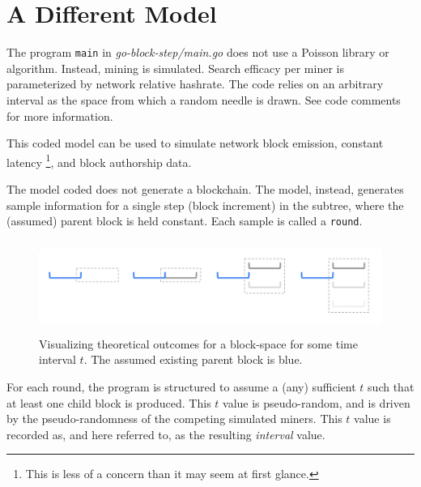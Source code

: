 \documentclass[11pt]{article}
\theoremstyle{plain}
\begin{document}

%
%


\section{\normalsize{A Different Model}}

The program \texttt{main} in \textit{go-block-step/main.go} does not use
a Poisson library or algorithm.
Instead, mining is simulated.
Search efficacy per miner is parameterized by network relative hashrate.
The code relies on an arbitrary interval as the space from which a random needle
is drawn. See code comments for more information.

This coded model can be used to simulate network block emission, constant latency\nolinebreak
\footnote{This is less of a concern than it may seem at first glance.}, and
block authorship data.

The model coded does not generate a blockchain. The model, instead,
generates sample information for a single step (block increment)
in the subtree, where the (assumed) parent block is held constant.
Each sample is called a \texttt{round}.

\begin{figure}[tph]
    \centering
    \includegraphics[height=3cm]{vis_theoretical_block-space.png}
    \caption{
        Visualizing theoretical outcomes for a block-space for some time interval
        $t$. The assumed existing parent block is blue.
    }
\end{figure}

For each round, the program is structured to assume a (any) sufficient $t$ such
that at least one child block is produced. This $t$ value is pseudo-random, and
is driven by the pseudo-randomness of the competing simulated miners.
This $t$ value is recorded as, and here referred to, as the resulting
\textit{interval} value.
\end{document}
